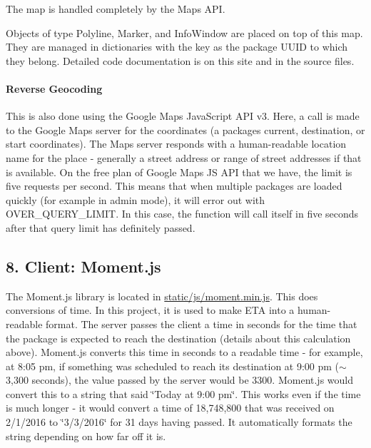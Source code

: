 The map is handled completely by the Maps A\+PI.

Objects of type {\ttfamily Polyline}, {\ttfamily Marker}, and {\ttfamily Info\+Window} are placed on top of this map. They are managed in dictionaries with the key as the package U\+U\+ID to which they belong. Detailed code documentation is on this site and in the source files.

\paragraph*{Reverse Geocoding}

This is also done using the Google Maps Java\+Script A\+PI v3. Here, a call is made to the Google Maps server for the coordinates (a package\textquotesingle{}s current, destination, or start coordinates). The Maps server responds with a human-\/readable location name for the place -\/ generally a street address or range of street addresses if that is available. On the free plan of Google Maps JS A\+PI that we have, the limit is five requests per second. This means that when multiple packages are loaded quickly (for example in admin mode), it will error out with {\ttfamily O\+V\+E\+R\+\_\+\+Q\+U\+E\+R\+Y\+\_\+\+L\+I\+M\+IT}. In this case, the function will call itself in five seconds after that query limit has definitely passed.

\subsection*{8. Client\+: Moment.\+js}

The Moment.\+js library is located in {\ttfamily \hyperlink{moment_8min_8js}{static/js/moment.\+min.\+js}}. This does conversions of time. In this project, it is used to make E\+TA into a human-\/readable format. The server passes the client a time in seconds for the time that the package is expected to reach the destination (details about this calculation above). Moment.\+js converts this time in seconds to a readable time -\/ for example, at 8\+:05 pm, if something was scheduled to reach its destination at 9\+:00 pm ($\sim$3,300 seconds), the value passed by the server would be 3300. Moment.\+js would convert this to a string that said \char`\"{}\+Today at 9\+:00 pm\char`\"{}. This works even if the time is much longer -\/ it would convert a time of 18,748,800 that was received on 2/1/2016 to \char`\"{}3/3/2016\char`\"{} for 31 days having passed. It automatically formats the string depending on how far off it is.

